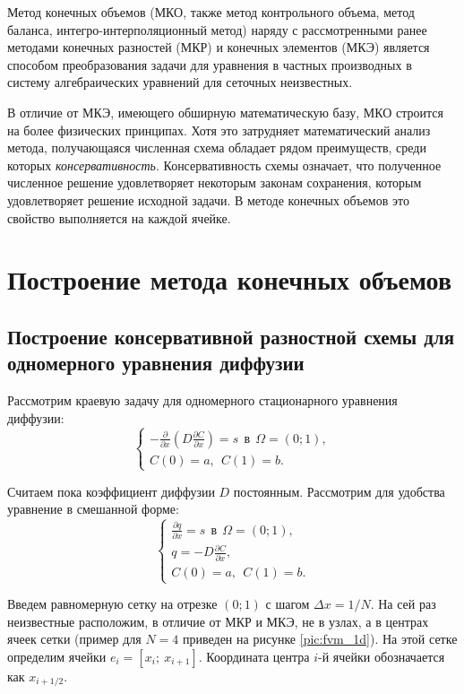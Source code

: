 \documentclass[a4paper, 11pt]{article}
\begin{document}
Метод конечных объемов (МКО, также метод контрольного объема, метод баланса, интегро-интерполяционный метод) наряду с рассмотренными ранее методами конечных разностей (МКР) и конечных элементов (МКЭ) является способом преобразования задачи для уравнения в частных производных в систему алгебраических уравнений для сеточных неизвестных. 

В отличие от МКЭ, имеющего обширную математическую базу, МКО строится на более физических принципах. Хотя это затрудняет математический анализ метода, получающаяся численная схема обладает рядом преимуществ, среди которых \textit{консервативность}. Консервативность схемы означает, что полученное численное решение удовлетворяет некоторым законам сохранения, которым удовлетворяет решение исходной задачи. В методе конечных объемов это свойство выполняется на каждой ячейке.

\section{Построение метода конечных объемов}
\subsection{Построение консервативной разностной схемы для одномерного уравнения диффузии}
Рассмотрим краевую задачу для одномерного стационарного уравнения диффузии:
\begin{equation}
\begin{cases}
-\frac{\partial}{\partial x} \left(D\frac{\partial C}{\partial x}\right) = s~~\text{в}~~\Omega=\left(0;1\right),\\
C\left(0\right) = a,~~C\left(1\right)=b.
\end{cases}
\end{equation}

Считаем пока коэффициент диффузии $D$ постоянным. 
Рассмотрим для удобства уравнение в смешанной форме:
\begin{equation}\label{eq:diff_1d_mixed}
\begin{cases}
\frac{\partial q}{\partial x} = s~~\text{в}~~\Omega=\left(0;1\right),\\
q = -D\frac{\partial C}{\partial x},\\
C\left(0\right) = a,~~C\left(1\right)=b.
\end{cases}
\end{equation}

Введем равномерную сетку на отрезке $(0;1)$ с шагом $\Delta x = 1/N$. На сей раз неизвестные расположим, в отличие от МКР и МКЭ, не в узлах, а в центрах ячеек сетки (пример для $N = 4$ приведен на рисунке \ref{pic:fvm_1d}). На этой сетке определим ячейки $e_i=\left[x_i;~x_{i+1}\right]$. Координата центра $i$-й ячейки обозначается как $x_{i+1/2}$.
\end{document}
